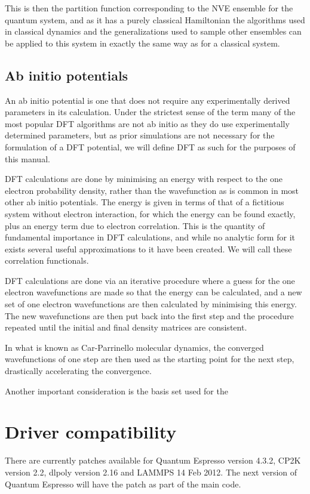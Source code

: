 \documentclass[12pt,fleqn]{report}
\begin{document}
This is then the partition function corresponding to the NVE ensemble for the 
quantum system, and as it has a purely classical Hamiltonian the algorithms 
used in classical dynamics and the generalizations used to sample other 
ensembles can be applied to this system in exactly the same way as for a 
classical system.
\subsection{Ab initio potentials}
An ab initio potential is one that does not require any experimentally derived 
parameters in its calculation. Under the strictest sense of the term many of 
the most popular DFT algorithms are not ab initio as they do use experimentally 
determined parameters, but as prior simulations are not necessary for the 
formulation of a DFT potential, we will define DFT as such for the purposes of 
this manual.

DFT calculations are done by minimising an energy with respect to the one 
electron probability density, rather than the wavefunction as is common in 
most other ab initio potentials. The energy is given in terms of that of a 
fictitious system without electron interaction, for which the energy can be 
found exactly, plus an energy term due to electron correlation. This is the 
quantity of fundamental importance in DFT calculations, and while no analytic 
form for it exists several useful approximations to it have been created. 
We will call these correlation functionals.

DFT calculations are done via an iterative procedure where a guess for the one 
electron wavefunctions are made so that the energy can be calculated, and a new 
set of one electron wavefunctions are then calculated by minimising this 
energy. The new wavefunctions are then put back into the first step and the 
procedure repeated until the initial and final density matrices are consistent.

In what is known as Car-Parrinello molecular dynamics, the converged 
wavefunctions of one step are then used as the starting point for the next 
step, drastically accelerating the convergence.

Another important consideration is the basis set used for the
\section{Driver compatibility}
There are currently patches available for Quantum Espresso version 4.3.2, CP2K
version 2.2, dlpoly version 2.16 and LAMMPS 14 Feb 2012. The next version of 
Quantum Espresso will have the patch as part of the main code.
\end{document}
